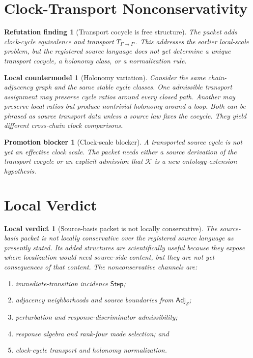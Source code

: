 \documentclass[11pt]{article}
\newcommand{\Step}{\mathsf{Step}}
\newcommand{\Adj}{\mathsf{Adj}_{\mathcal{S}}}
\newtheorem{refutationfinding}{Refutation finding}
\newtheorem{countermodel}{Local countermodel}
\newtheorem{blocker}{Promotion blocker}
\newtheorem{localverdict}{Local verdict}
\begin{document}
\section{Clock-Transport Nonconservativity}

\begin{refutationfinding}[Transport cocycle is free structure]
The packet adds clock-cycle equivalence and transport
\(T_{\Gamma\to\Gamma'}\). This addresses the earlier local-scale problem, but
the registered source language does not yet determine a unique transport
cocycle, a holonomy class, or a normalization rule.
\end{refutationfinding}

\begin{countermodel}[Holonomy variation]
Consider the same chain-adjacency graph and the same stable cycle classes.
One admissible transport assignment may preserve cycle ratios around every
closed path. Another may preserve local ratios but produce nontrivial holonomy
around a loop. Both can be phrased as source transport data unless a source
law fixes the cocycle. They yield different cross-chain clock comparisons.
\end{countermodel}

\begin{blocker}[Clock-scale blocker]
A transported source cycle is not yet an effective clock scale. The packet
needs either a source derivation of the transport cocycle or an explicit
admission that \(\mathcal{K}\) is a new ontology-extension hypothesis.
\end{blocker}

\section{Local Verdict}

\begin{localverdict}[Source-basis packet is not locally conservative]
The source-basis packet is not locally conservative over the registered source
language as presently stated. Its added structures are scientifically useful
because they expose where localization would need source-side content, but
they are not yet consequences of that content. The nonconservative channels
are:
\begin{enumerate}
    \item immediate-transition incidence \(\Step\);
    \item adjacency neighborhoods and source boundaries from \(\Adj\);
    \item perturbation and response-discriminator admissibility;
    \item response algebra and rank-four mode selection; and
    \item clock-cycle transport and holonomy normalization.
\end{enumerate}
\end{localverdict}
\end{document}
